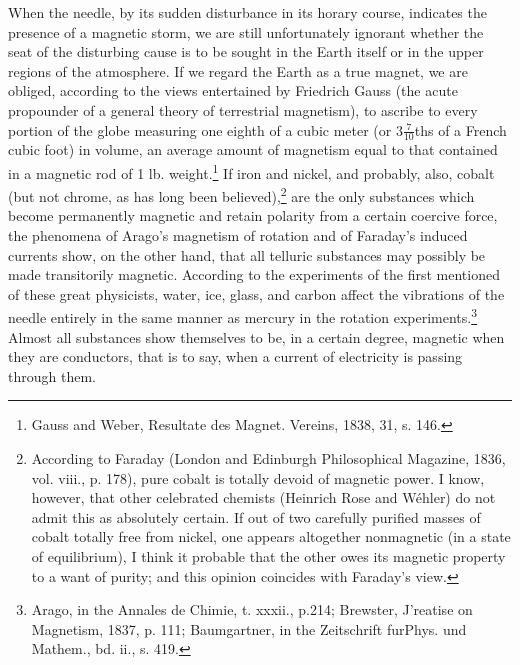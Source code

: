 When the needle, by its sudden disturbance in its horary course, indicates the presence of a magnetic storm, we are still unfortunately ignorant whether the seat of the disturbing cause is to be sought in the Earth itself or in the upper regions of the atmosphere. If we regard the Earth as a true magnet, we are obliged, according to the views entertained by Friedrich Gauss (the acute propounder of a general theory of terrestrial magnetism), to ascribe to every portion of the globe measuring one eighth of a cubic meter (or $3\frac{7}{10}$ths of a French cubic foot) in volume, an average amount of magnetism equal to that contained in a magnetic rod of 1 lb. weight.\footnote{Gauss and Weber, Resultate des Magnet. Vereins, 1838, 31, s. 146.} If iron and nickel, and probably, also, cobalt (but not chrome, as has long been believed),\footnote{According to Faraday (London and Edinburgh Philosophical Magazine, 1836, vol. viii., p. 178), pure cobalt is totally devoid of magnetic power. I know, however, that other celebrated chemists (Heinrich Rose and W\'{e}hler) do not admit this as absolutely certain. If out of two carefully purified masses of cobalt totally free from nickel, one appears altogether nonmagnetic (in a state of equilibrium), I think it probable that the other owes its magnetic property to a want of purity; and this opinion coincides with Faraday's view.} are the only substances which become permanently magnetic and retain polarity from a certain coercive force, the phenomena of Arago's magnetism of rotation and of Faraday's induced currents show, on the other hand, that all telluric substances may possibly be made transitorily magnetic. According to the experiments of the first mentioned of these great physicists, water, ice, glass, and carbon affect the vibrations of the needle entirely in the same manner as mercury in the rotation experiments.\footnote{Arago, in the Annales de Chimie, t. xxxii., p.214; Brewster, J'reatise on Magnetism, 1837, p. 111; Baumgartner, in the Zeitschrift furPhys. und Mathem., bd. ii., s. 419.} Almost all substances show themselves to be, in a certain degree, magnetic when they are conductors, that is to say, when a current of electricity is passing through them.

